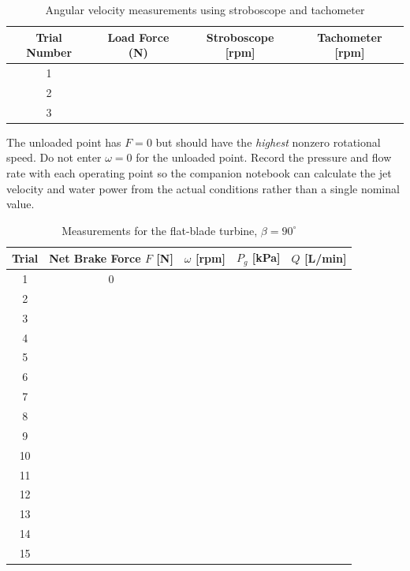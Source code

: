 \documentclass[12pt,letterpaper]{article}
\begin{document}
\begin{table}[H]
\centering
\caption{Angular velocity measurements using stroboscope and tachometer}
\label{tab:strobe-tach}
\begin{tabular}{cccc}
\toprule
Trial Number & Load Force (N) & Stroboscope [rpm] & Tachometer [rpm] \\
\midrule
1 & & & \\
2 & & & \\
3 & & & \\
\bottomrule
\end{tabular}
\end{table}

The unloaded point has \(F=0\) but should have the \emph{highest} nonzero rotational speed. Do not enter \(\omega=0\) for the unloaded point. Record the pressure and flow rate with each operating point so the companion notebook can calculate the jet velocity and water power from the actual conditions rather than a single nominal value.

\begin{table}[H]
\centering
\caption{Measurements for the flat-blade turbine, \(\beta=90^\circ\)}
\label{tab:main-data-90}
\begin{tabular}{ccccc}
\toprule
Trial & Net Brake Force \(F\) [N] & \(\omega\) [rpm] & \(P_g\) [kPa] & \(Q\) [L/min] \\
\midrule
1 & 0 & & & \\
2 & & & & \\
3 & & & & \\
4 & & & & \\
5 & & & & \\
6 & & & & \\
7 & & & & \\
8 & & & & \\
9 & & & & \\
10 & & & & \\
11 & & & & \\
12 & & & & \\
13 & & & & \\
14 & & & & \\
15 & & & & \\
\bottomrule
\end{tabular}
\end{table}
\end{document}

